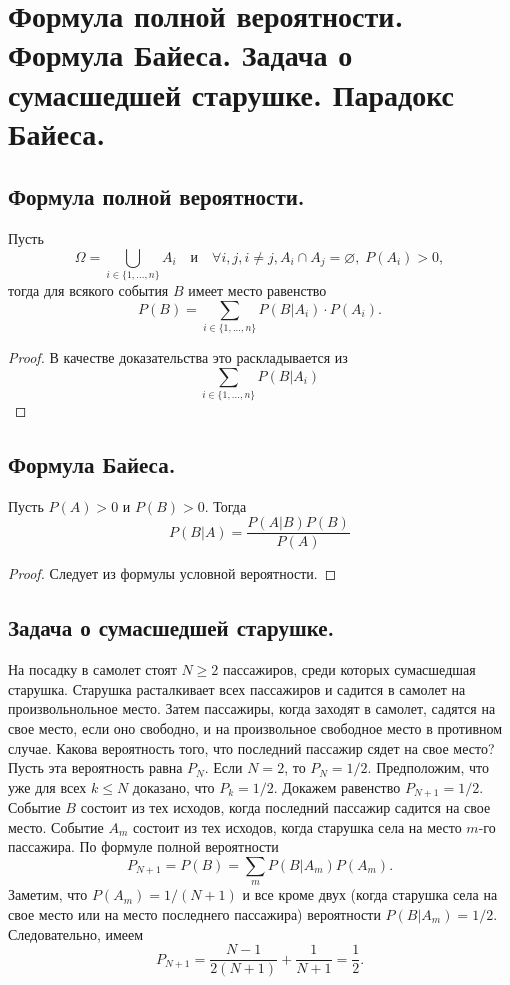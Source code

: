 \section{Формула полной вероятности. Формула Байеса. Задача о сумасшедшей старушке. Парадокс Байеса.}

\subsection{Формула полной вероятности.}
Пусть
$$\Omega = \bigcup\limits_{i \in \{1,...,n\}} A_i \quad \text{и} \quad \forall i,j, i \neq j, A_i \cap A_j = \varnothing, \; P(A_i) > 0,$$
тогда для всякого события $B$ имеет место равенство
$$P(B) = \sum\limits_{i \in \{1,...,n\}}P(B|A_i) \cdot P(A_i).$$
\begin{proof}
    В качестве доказательства это раскладывается из
    $$\sum\limits_{i \in \{1,...,n\}} P(B|A_i)$$
\end{proof}

\subsection{Формула Байеса.}
Пусть $P(A) > 0$ и $P(B) > 0$. Тогда
$$P(B|A) = \frac{P(A|B)P(B)}{P(A)}$$
\begin{proof}
    Следует из формулы условной вероятности.
\end{proof}

\subsection{Задача о сумасшедшей старушке.}
На посадку в самолет стоят $N \geqslant 2$ пассажиров, среди которых сумасшедшая старушка. Старушка расталкивает всех пассажиров и садится в самолет на произвольнольное место. Затем пассажиры, когда заходят в самолет, садятся на свое место, если оно свободно, и на произвольное свободное место в противном случае. Какова вероятность того, что последний пассажир сядет на свое место?
\newline
Пусть эта вероятность равна $P_N$. Если $N = 2$, то $P_N = 1/2$. Предположим, что уже для всех $k \leqslant N$ доказано, что $P_k = 1/2$. Докажем равенство $P_{N+1} = 1/2$. Событие $B$ состоит из тех исходов, когда последний пассажир садится на свое место. Событие $A_m$ состоит из тех исходов, когда старушка села на место $m$-го пассажира. По формуле полной вероятности
$$P_{N+1} = P(B) = \sum_m P(B|A_m)P(A_m).$$
Заметим, что $P(A_m) = 1/(N+1)$ и все кроме двух (когда старушка села на свое место или на место последнего пассажира) вероятности $P(B|A_m) = 1/2$. Следовательно, имеем
$$P_{N+1} = \frac{N-1}{2(N+1)} + \frac{1}{N+1} = \frac{1}{2}.$$

